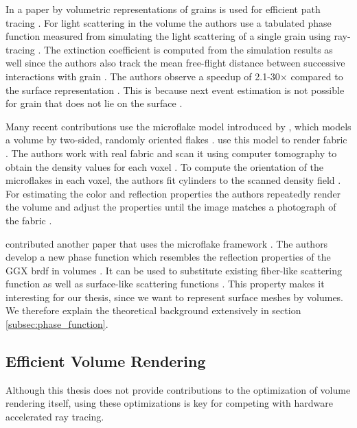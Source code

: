 In a paper by \citeauthor{meng_multi_scale_modeling_and_rendering_of_granular_materials} volumetric representations of grains is used for efficient path tracing \cite{meng_multi_scale_modeling_and_rendering_of_granular_materials}.
For light scattering in the volume the authors use a tabulated phase function measured from simulating the light scattering of a single grain using ray-tracing \cite{meng_multi_scale_modeling_and_rendering_of_granular_materials}.
The extinction coefficient is computed from the simulation results as well since the authors also track the mean free-flight distance between successive interactions with grain \cite{meng_multi_scale_modeling_and_rendering_of_granular_materials}.
The authors observe a speedup of 2.1-30$\times$ compared to the surface representation \cite{meng_multi_scale_modeling_and_rendering_of_granular_materials}.
This is because next event estimation is not possible for grain that does not lie on the surface \cite{meng_multi_scale_modeling_and_rendering_of_granular_materials}.

Many recent contributions use the microflake model introduced by \citeauthor{microflake}, which models a volume by two-sided, randomly oriented flakes \cite{microflake}.
\citeauthor{zhao_building_volumetric_appearance_models} use this model to render fabric \cite{zhao_building_volumetric_appearance_models}.
The authors work with real fabric and scan it using computer tomography to obtain the density values for each voxel \cite{zhao_building_volumetric_appearance_models}.
To compute the orientation of the microflakes in each voxel, the authors fit cylinders to the scanned density field \cite{zhao_building_volumetric_appearance_models}.
For estimating the color and reflection properties the authors repeatedly render the volume and adjust the properties until the image matches a photograph of the fabric \cite[p. 5]{zhao_building_volumetric_appearance_models}.

\citeauthor{sggx} contributed another paper that uses the microflake framework \cite{sggx}.
The authors develop a new phase function which resembles the reflection properties of the GGX \ac{brdf} in volumes \cite{sggx}.
It can be used to substitute existing fiber-like scattering function as well as surface-like scattering functions \cite{sggx}.
This property makes it interesting for our thesis, since we want to represent surface meshes by volumes.
We therefore explain the theoretical background extensively in section \ref{subsec:phase_function}.

\subsection{Efficient Volume Rendering}
Although this thesis does not provide contributions to the optimization of volume rendering itself, using these optimizations is key for competing with hardware accelerated ray tracing.


